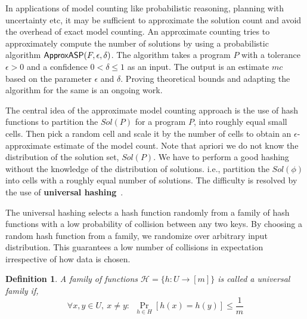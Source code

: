 \documentclass{article}
\newtheorem{definition}{Definition}
\newcommand{\fff}{$P$\xspace}
\newcommand{\mc}{$mc$\xspace}
\newcommand{\ep}{\epsilon\xspace}
\newcommand{\del}{\delta\xspace}
\def\appasp{\normalfont \textsf{ApproxASP}\xspace}
\newcommand{\sol}{$Sol(P)$\xspace}
\begin{document}
In applications of model counting like probabilistic reasoning, planning with uncertainty etc, it may be sufficient to approximate the solution count and avoid the overhead of exact model counting.
%
An approximate counting tries to approximately compute the number of solutions by using a probabilistic algorithm $\appasp(F, \epsilon, \delta)$.
%
The algorithm takes a program \fff with a tolerance $\epsilon > 0$ and a confidence $0 < \delta \leq 1$ as an input.
%
The output is an estimate \mc based on the parameter $\ep$ and $\del$.
%
Proving theoretical bounds and adapting the algorithm for the same is an ongoing work.

The central idea of the approximate model counting approach is the use of hash functions to partition the \sol for a program \fff, into roughly equal small cells.
%
Then pick a random cell and scale it by the number of cells to obtain an $\ep$-approximate estimate of the model count.
%
Note that apriori we do not know the distribution of the solution set, \sol.
%
We have to perform a good hashing without the knowledge of the distribution of solutions. i.e., partition the $Sol(\phi)$ into cells with a roughly equal number of solutions.
%
%
%
The difficulty is resolved by the use of \textbf{universal hashing}~\cite{DBLP:conf/stoc/CarterW77}.

The universal hashing selects a hash function randomly from a family of hash functions with a low probability of collision between any two keys. 
%
By choosing a random hash function from a family, we randomize over arbitrary input distribution. This guarantees a low number of collisions in expectation irrespective of how data is chosen.

\begin{definition}
A family of functions $\mathcal{H}=\{h: U \to [m]\}$  is called a universal family if,
\[ \forall x,y\in U,~x\neq y:~~\Pr _{h\in H}[h(x)=h(y)]\leq {\frac {1}{m}} \]
\end{definition}
\end{document}
